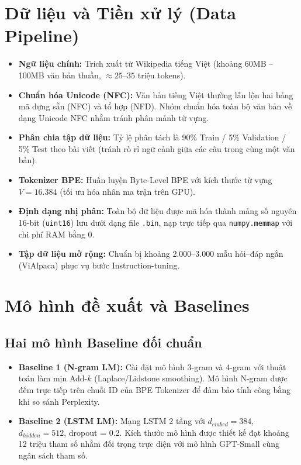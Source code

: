 \documentclass[11pt,a4paper]{article}
\begin{document}
\section{Dữ liệu và Tiền xử lý (Data Pipeline)}
\begin{itemize}
    \item \textbf{Ngữ liệu chính:} Trích xuất từ Wikipedia tiếng Việt (khoảng 60MB -- 100MB văn bản thuần, $\approx 25$--$35$ triệu tokens).
    \item \textbf{Chuẩn hóa Unicode (NFC):} Văn bản tiếng Việt thường lẫn lộn hai bảng mã dựng sẵn (NFC) và tổ hợp (NFD). Nhóm chuẩn hóa toàn bộ văn bản về dạng Unicode NFC nhằm tránh phân mảnh từ vựng.
    \item \textbf{Phân chia tập dữ liệu:} Tỷ lệ phân tách là 90\% Train / 5\% Validation / 5\% Test theo bài viết (tránh rò rỉ ngữ cảnh giữa các câu trong cùng một văn bản).
    \item \textbf{Tokenizer BPE:} Huấn luyện Byte-Level BPE với kích thước từ vựng $V = 16.384$ (tối ưu hóa nhân ma trận trên GPU).
    \item \textbf{Định dạng nhị phân:} Toàn bộ dữ liệu được mã hóa thành mảng số nguyên 16-bit (\texttt{uint16}) lưu dưới dạng file \texttt{.bin}, nạp trực tiếp qua \texttt{numpy.memmap} với chi phí RAM bằng 0.
    \item \textbf{Tập dữ liệu mở rộng:} Chuẩn bị khoảng 2.000--3.000 mẫu hỏi--đáp ngắn (ViAlpaca) phục vụ bước Instruction-tuning.
\end{itemize}

\section{Mô hình đề xuất và Baselines}
\subsection{Hai mô hình Baseline đối chuẩn}
\begin{itemize}
    \item \textbf{Baseline 1 (N-gram LM):} Cài đặt mô hình 3-gram và 4-gram với thuật toán làm mịn Add-$k$ (Laplace/Lidstone smoothing). Mô hình N-gram được đếm trực tiếp trên chuỗi ID của BPE Tokenizer để đảm bảo tính công bằng khi so sánh Perplexity.
    \item \textbf{Baseline 2 (LSTM LM):} Mạng LSTM 2 tầng với $d_{embed}=384$, $d_{hidden}=512$, dropout = 0.2. Kích thước mô hình được thiết kế đạt khoảng 12 triệu tham số nhằm đối trọng trực diện với mô hình GPT-Small cùng ngân sách tham số.
\end{itemize}
\end{document}
